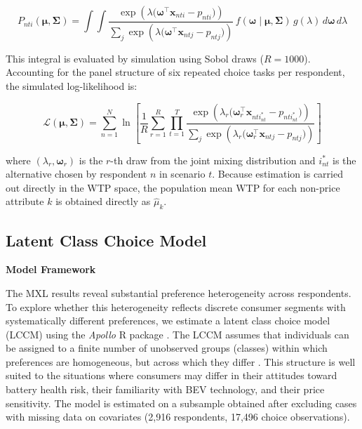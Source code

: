 \documentclass[a4paper,fleqn]{cas-sc}   %
\begin{document}
\begin{equation}
    P_{nti}(\boldsymbol{\mu}, \boldsymbol{\Sigma}) = \int\!\int \frac{\exp\!\left(\lambda\bigl(\boldsymbol{\omega}^{\top}\mathbf{x}_{nti} - p_{nti}\bigr)\right)}{\displaystyle\sum_{j} \exp\!\left(\lambda\bigl(\boldsymbol{\omega}^{\top}\mathbf{x}_{ntj} - p_{ntj}\bigr)\right)} \, f(\boldsymbol{\omega} \mid \boldsymbol{\mu}, \boldsymbol{\Sigma})\, g(\lambda) \, d\boldsymbol{\omega}\, d\lambda
    \label{eq:mxl_prob}
\end{equation}

\noindent This integral is evaluated by simulation using Sobol draws ($R = 1000$). Accounting for the panel structure of six repeated choice tasks per respondent, the simulated log-likelihood is:

\begin{equation}
    \mathcal{L}(\boldsymbol{\mu}, \boldsymbol{\Sigma}) = \sum_{n=1}^{N} \ln \left[ \frac{1}{R} \sum_{r=1}^{R} \prod_{t=1}^{T} \frac{\exp\!\left(\lambda_r\bigl(\boldsymbol{\omega}_r^{\top}\mathbf{x}_{nti_{nt}^*} - p_{nti_{nt}^*}\bigr)\right)}{\displaystyle\sum_{j} \exp\!\left(\lambda_r\bigl(\boldsymbol{\omega}_r^{\top}\mathbf{x}_{ntj} - p_{ntj}\bigr)\right)} \right]
    \label{eq:mxl_ll}
\end{equation}

\noindent where $(\lambda_r, \boldsymbol{\omega}_r)$ is the $r$-th draw from the joint mixing distribution and $i_{nt}^*$ is the alternative chosen by respondent $n$ in scenario $t$. Because estimation is carried out directly in the WTP space, the population mean WTP for each non-price attribute $k$ is obtained directly as $\hat{\mu}_k$.



\subsection{Latent Class Choice Model}
\vspace{\baselineskip}
\noindent \textbf{Model Framework} \par

The MXL results reveal substantial preference heterogeneity across respondents. To explore whether this heterogeneity reflects discrete consumer segments with systematically different preferences, we estimate a latent class choice model (LCCM) using the \textit{Apollo} R package \parencite{hess2019apollo}. The LCCM assumes that individuals can be assigned to a finite number of unobserved groups (classes) within which preferences are homogeneous, but across which they differ \parencite{kamakuraProbabilisticChoiceModel1989, greeneLatentClassModel2003}. This structure is well suited to the situations where consumers may differ in their attitudes toward battery health risk, their familiarity with BEV technology, and their price sensitivity. The model is estimated on a subsample obtained after excluding cases with missing data on covariates (2,916 respondents, 17,496 choice observations).
\end{document}
